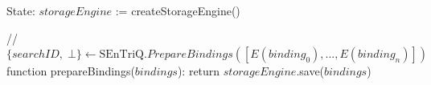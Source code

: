 State:
    $storageEngine$ := createStorageEngine()

// $\{ searchID, \; \bot \} \leftarrow \textrm{SEnTriQ}.PrepareBindings([E(binding_0),...,E(binding_n)])$
function prepareBindings($bindings$):
    return $storageEngine$.save($bindings$) 